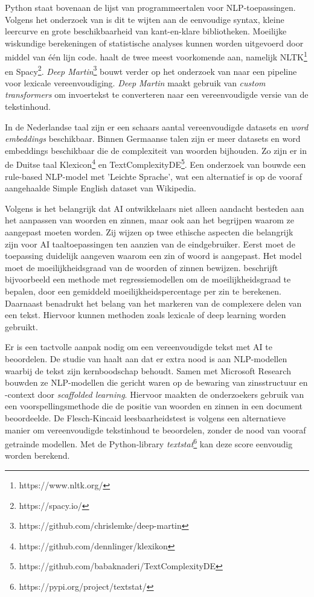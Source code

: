 Python staat bovenaan de lijst van programmeertalen voor NLP-toepassingen. Volgens het onderzoek van \textcite{Thangarajah2019} is dit te wijten aan de eenvoudige syntax, kleine leercurve en grote beschikbaarheid van kant-en-klare bibliotheken. Moeilijke wiskundige berekeningen of statistische analyses kunnen worden uitgevoerd door middel van één lijn code. \textcite{Malik2022} haalt de twee meest voorkomende aan, namelijk NLTK\footnote{https://www.nltk.org/} en Spacy\footnote{https://spacy.io/}. \textit{Deep Martin}\footnote{https://github.com/chrislemke/deep-martin} bouwt verder op het onderzoek van \textcite{Shardlow2014} naar een pipeline voor lexicale vereenvoudiging. \textit{Deep Martin} maakt gebruik van \textit{custom transformers} om invoertekst te converteren naar een vereenvoudigde versie van de tekstinhoud.

In de Nederlandse taal zijn er een schaars aantal vereenvoudigde datasets en \textit{word embeddings} beschikbaar. Binnen Germaanse talen zijn er meer datasets en word embeddings beschikbaar die de complexiteit van woorden bijhouden. Zo zijn er in de Duitse taal Klexicon\footnote{https://github.com/dennlinger/klexikon} en TextComplexityDE\footnote{https://github.com/babaknaderi/TextComplexityDE}. Een onderzoek van \textcite{Suter2016} bouwde een rule-based NLP-model met 'Leichte Sprache', wat een alternatief is op de vooraf aangehaalde Simple English dataset van Wikipedia.

Volgens \textcite{Garbacea2021} is het belangrijk dat AI ontwikkelaars niet alleen aandacht besteden aan het aanpassen van woorden en zinnen, maar ook aan het begrijpen waarom ze aangepast moeten worden. Zij wijzen op twee ethische aspecten die belangrijk zijn voor AI taaltoepassingen ten aanzien van de eindgebruiker. Eerst moet de toepassing duidelijk aangeven waarom een zin of woord is aangepast. Het model moet de moeilijkheidsgraad van de woorden of zinnen bewijzen. \textcite{Iavarone2021} beschrijft bijvoorbeeld een methode met regressiemodellen om de moeilijkheidsgraad te bepalen, door een gemiddeld moeilijkheidspercentage per zin te berekenen. Daarnaast benadrukt \textcite{Garbacea2021} het belang van het markeren van de complexere delen van een tekst. Hiervoor kunnen methoden zoals lexicale of deep learning worden gebruikt.

Er is een tactvolle aanpak nodig om een vereenvoudigde tekst met AI te beoordelen. De studie van \textcite{Swayamdipta2019} haalt aan dat er extra nood is aan NLP-modellen waarbij de tekst zijn kernboodschap behoudt. Samen met Microsoft Research bouwden ze NLP-modellen die gericht waren op de bewaring van zinsstructuur en -context door \emph{scaffolded learning}. Hiervoor maakten de onderzoekers gebruik van een voorspellingsmethode die de positie van woorden en zinnen in een document beoordeelde. De Flesch-Kincaid leesbaarheidstest is volgens \textcite{Readable2021} een alternatieve manier om vereenvoudigde tekstinhoud te beoordelen, zonder de nood van vooraf getrainde modellen. Met de Python-library \textit{textstat}\footnote{https://pypi.org/project/textstat/} kan deze score eenvoudig worden berekend. 

